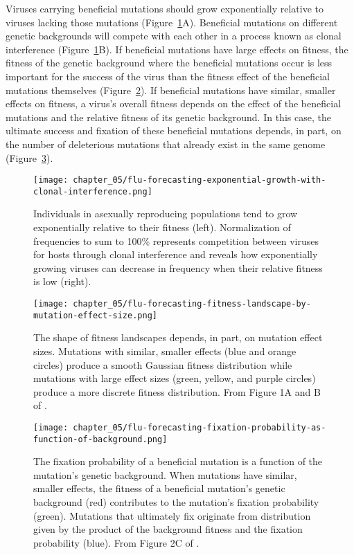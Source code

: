 Viruses carrying beneficial mutations should grow exponentially relative to viruses lacking those mutations (Figure~\ref{fig:exponential-growth-with-clonal-interference}A).
Beneficial mutations on different genetic backgrounds will compete with each other in a process known as clonal interference (Figure~\ref{fig:exponential-growth-with-clonal-interference}B).
If beneficial mutations have large effects on fitness, the fitness of the genetic background where the beneficial mutations occur is less important for the success of the virus than the fitness effect of the beneficial mutations themselves (Figure~\ref{fig:fitness-landscape-by-mutation-effect-size}).
If beneficial mutations have similar, smaller effects on fitness, a virus's overall fitness depends on the effect of the beneficial mutations and the relative fitness of its genetic background.
In this case, the ultimate success and fixation of these beneficial mutations depends, in part, on the number of deleterious mutations that already exist in the same genome (Figure~\ref{fig:fixation-probability-as-function-of-background}).

\begin{figure}
  \centering
  \texttt{[image: chapter\_05/flu-forecasting-exponential-growth-with-clonal-interference.png]}
  \caption{Individuals in asexually reproducing populations tend to grow exponentially relative to their fitness (left).
    Normalization of frequencies to sum to 100\% represents competition between viruses for hosts through clonal interference and reveals how exponentially growing viruses can decrease in frequency when their relative fitness is low (right).\label{fig:exponential-growth-with-clonal-interference} }
\end{figure}

\begin{figure}
  \centering
  \texttt{[image: chapter\_05/flu-forecasting-fitness-landscape-by-mutation-effect-size.png]}
  \caption{The shape of fitness landscapes depends, in part, on mutation effect sizes.
    Mutations with similar, smaller effects (blue and orange circles) produce a smooth Gaussian fitness distribution while mutations with large effect sizes (green, yellow, and purple circles) produce a more discrete fitness distribution.
    From Figure 1A and B of \citet{Neher2013}.\label{fig:fitness-landscape-by-mutation-effect-size} }
\end{figure}

\begin{figure}
  \centering
  \texttt{[image: chapter\_05/flu-forecasting-fixation-probability-as-function-of-background.png]}
  \caption{The fixation probability of a beneficial mutation is a function of the mutation's genetic background.
    When mutations have similar, smaller effects, the fitness of a beneficial mutation's genetic background (red) contributes to the mutation's fixation probability (green).
    Mutations that ultimately fix originate from distribution given by the product of the background fitness and the fixation probability (blue).
    From Figure 2C of \citet{Neher2013}.\label{fig:fixation-probability-as-function-of-background} }
\end{figure}

